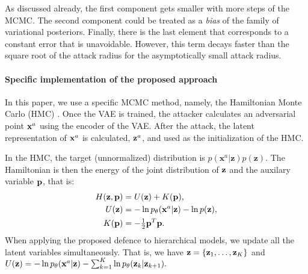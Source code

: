 As discussed already, the first component gets smaller with more steps of the MCMC. %
The second component could be treated as a \textit{bias} of the family of variational posteriors. Finally, there is the last element that corresponds to a constant error that is unavoidable. However, this term decays faster than the square root of the attack radius for the asymptotically small attack radius.

\paragraph{Specific implementation of the proposed approach}
In this paper, we use a specific MCMC method, namely, the Hamiltonian Monte Carlo (HMC) \cite{betancourt2017conceptual, duane1987hybrid}. Once the VAE is trained, the attacker calculates an adversarial point ${\mathbf{x}}^a$ using the encoder of the VAE. After the attack, the latent representation of ${\mathbf{x}}^a$ is calculated, ${\mathbf{z}}^a$, and used as the initialization of the HMC.

In the HMC, the target (unnormalized) distribution is $p(\mathbf{x}^{a}|\mathbf{z}) p(\mathbf{z})$. The Hamiltonian is then the energy of the joint distribution of ${\mathbf{z}}$ and the auxilary variable ${\mathbf{p}}$, that is:
\begin{align}
    H({\mathbf{z}}, {\mathbf{p}}) &= U({\mathbf{z}}) + K({\mathbf{p}}),\\
    U({\mathbf{z}}) &= - \ln p_{\theta}(\mathbf{x}^{a}|\mathbf{z}) - \ln p(\mathbf{z}),\\
    K({\mathbf{p}}) &= -\tfrac12 {\mathbf{p}}^T{\mathbf{p}}.
\end{align}
When applying the proposed defence to hierarchical models, we update all the latent variables simultaneously. That is, we have ${\mathbf{z}} = \{ {\mathbf{z}}_1, \dots, {\mathbf{z}}_K\}$ and
$U({\mathbf{z}}) = -\ln {p_{\theta}({\mathbf{x}}^a|{\mathbf{z}})} - \sum_{k=1}^K\ln p_{\theta}({\mathbf{z}}_k|{\mathbf{z}}_{k+1}). $

